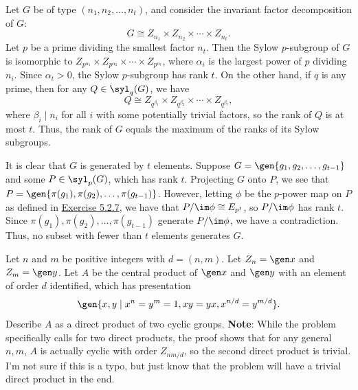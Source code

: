 \begin{solalph}
    \item Let $G$ be of type $(n_1, n_2, \ldots, n_t)$, and consider the invariant factor decomposition of $G$:
    \[G \cong Z_{n_1} \times Z_{n_2} \times \cdots \times Z_{n_t}.\]
    Let $p$ be a prime dividing the smallest factor $n_t$. Then the Sylow $p$-subgroup of $G$ is isomorphic to $Z_{p^{\alpha_1}} \times Z_{p^{\alpha_2}} \times \cdots \times Z_{p^{\alpha_t}}$, where $\alpha_i$ is the largest power of $p$ dividing $n_i$. Since $\alpha_t > 0$, the Sylow $p$-subgroup has rank $t$. On the other hand, if $q$ is any prime, then for any $Q \in \syl_q(G)$, we have
    \[Q \cong Z_{q^{\beta_1}} \times Z_{q^{\beta_2}} \times \cdots \times Z_{q^{\beta_t}},\]
    where $\beta_i \mid n_i$ for all $i$ with some potentially trivial factors, so the rank of $Q$ is at most $t$. Thus, the rank of $G$ equals the maximum of the ranks of its Sylow subgroups.
    \item It is clear that $G$ is generated by $t$ elements. Suppose $G = \gen{g_1, g_2, \ldots, g_{t-1}}$ and some $P \in \syl_p(G)$, which has rank $t$. Projecting $G$ onto $P$, we see that $P = \gen{\pi(g_1), \pi(g_2), \ldots, \pi(g_{t-1})}$. However, letting $\phi$ be the $p$-power map on $P$ as defined in \hyperref[ex5.2.7]{Exercise 5.2.7}, we have that $P/\im\phi \cong E_{p^t}$, so $P/\im\phi$ has rank $t$. Since $\pi(g_1), \pi(g_2), \ldots, \pi(g_{t-1})$ generate $P/\im\phi$, we have a contradiction. Thus, no subset with fewer than $t$ elements generates $G$.
\end{solalph}

\begin{specialexercise}\label{ex5.2.12}
    Let $n$ and $m$ be positive integers with $d = (n, m)$. Let $Z_n = \gen x$ and $Z_m = \gen y$. Let $A$ be the central product of $\gen x$ and $\gen y$ with an element of order $d$ identified, which has presentation
    \[\gen{x, y \mid x^n = y^m = 1, xy = yx, x^{n/d} = y^{m/d}}.\]
    Describe $A$ as a direct product of two cyclic groups.
    \down
    \noindent\textbf{Note}: While the problem specifically calls for two direct products, the proof shows that for any general $n, m$, $A$ is actually cyclic with order $Z_{nm/d}$, so the second direct product is trivial. I'm not sure if this is a typo, but just know that the problem will have a trivial direct product in the end.
\end{specialexercise}

